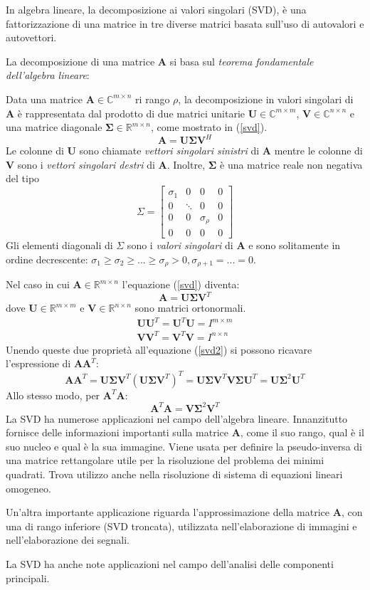 In algebra lineare, la decomposizione ai valori singolari (SVD), è una fattorizzazione di una matrice in tre diverse matrici basata sull'uso di autovalori e autovettori.

La decomposizione di una matrice $\mathbf{A}$ si basa sul \textit{teorema fondamentale dell'algebra lineare}: 

Data una matrice $\mathbf{A}\in\mathbb{C}^{m\times n}$ ri rango $\rho$, la decomposizione in valori singolari di $\mathbf{A}$ è rappresentata dal prodotto di due matrici unitarie $\mathbf{U}\in\mathbb{C}^{m\times m}$, $\mathbf{V}\in\mathbb{C}^{n\times n}$ e una matrice diagonale $\mathbf{\Sigma}\in\mathbb{R}^{m\times n}$, come mostrato in (\ref{svd}).
\begin{equation}\label{svd}
\mathbf{A}=\mathbf{U}\mathbf{\Sigma}\mathbf{V}^H
\end{equation}
Le colonne di $\mathbf{U}$ sono chiamate \textit{vettori singolari sinistri} di $\mathbf{A}$ mentre le colonne di $\mathbf{V}$ sono i \textit{vettori singolari destri} di $\mathbf{A}$. Inoltre, $\mathbf{\Sigma}$ è una matrice reale non negativa del tipo
\[
\Sigma=\begin{bmatrix}
\sigma_1 & 0 & 0 & 0\\
0 & \ddots & 0 & 0\\
0 & 0 & \sigma_{\rho} & 0\\
0 & 0 & 0 & 0
\end{bmatrix}
\]
Gli elementi diagonali di $\Sigma$ sono i \textit{valori singolari} di $\mathbf{A}$ e sono solitamente in ordine decrescente: $\sigma_1 \geq \sigma_2 \geq ... \geq \sigma_{\rho} > 0, \sigma_{\rho+1}=...=0$.

Nel caso in cui $\mathbf{A}\in\mathbb{R}^{m\times n}$ l'equazione (\ref{svd}) diventa:
\begin{equation}\label{svd2}
\mathbf{A}=\mathbf{U}\mathbf{\Sigma}\mathbf{V}^T
\end{equation}
dove $\mathbf{U}\in\mathbb{R}^{m\times m}$ e $\mathbf{V}\in\mathbb{R}^{n\times n}$ sono matrici ortonormali.
\begin{eqnarray}
\mathbf{U}\mathbf{U}^T=\mathbf{U}^T\mathbf{U}=I^{m\times m}\\
\mathbf{V}\mathbf{V}^T=\mathbf{V}^T\mathbf{V}=I^{n\times n}
\end{eqnarray}
Unendo queste due proprietà all'equazione (\ref{svd2}) si possono ricavare l'espressione di $\mathbf{A}\mathbf{A}^T$:
\[
\mathbf{A}\mathbf{A}^T=\mathbf{U}\mathbf{\Sigma}\mathbf{V}^T(\mathbf{U}\mathbf{\Sigma}\mathbf{V}^T)^T=\mathbf{U}\mathbf{\Sigma}\mathbf{V}^T\mathbf{V}\mathbf{\Sigma}\mathbf{U}^T=\mathbf{U}\mathbf{\Sigma}^2\mathbf{U}^T
\]
Allo stesso modo, per $\mathbf{A}^T\mathbf{A}$:
\[
\mathbf{A}^T\mathbf{A}=\mathbf{V}\mathbf{\Sigma}^2\mathbf{V}^T
\]
La SVD ha numerose applicazioni nel campo dell'algebra lineare. Innanzitutto fornisce delle informazioni importanti sulla matrice $\mathbf{A}$, come il suo rango, qual è il suo nucleo e qual è la sua immagine. Viene usata per definire la pseudo-inversa di una matrice rettangolare utile per la risoluzione del problema dei minimi quadrati. Trova utilizzo anche nella risoluzione di sistema di equazioni lineari omogeneo.

Un'altra importante applicazione riguarda l'approssimazione della matrice $\mathbf{A}$, con una di rango inferiore (SVD troncata), utilizzata nell'elaborazione di immagini e nell'elaborazione dei segnali.

La SVD ha anche note applicazioni nel campo dell'analisi delle componenti principali.



